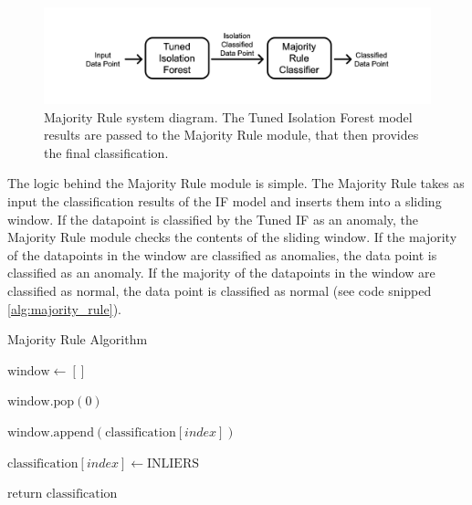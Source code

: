 \documentclass[futureinternet,article,submit,pdftex,moreauthors]{Definitions/mdpi}
\begin{document}
\begin{figure}[H]
	\includegraphics[width=12.5 cm]{img/ModulesStructure.jpg}
	\caption{Majority Rule system diagram. The Tuned Isolation Forest model results are passed to the Majority Rule module, that then provides the final classification.}
	\label{fig:MajorityRuleDiagram}
	\end{figure}   
\unskip

The logic behind the Majority Rule module is simple. The Majority Rule takes as input the classification results of the IF model and inserts them into a sliding window. If the datapoint is classified by the Tuned IF as an anomaly, the Majority Rule module checks the contents of the sliding window. If the 
majority of the datapoints in the window are classified as anomalies, the data point is classified as an anomaly. If the majority of the datapoints in the window are classified as normal, the data point is classified as normal (see code snipped \ref{alg:majority_rule}).

\begin{algorithm}
	\caption{Majority Rule Algorithm}\label{alg:majority_rule}
	\begin{algorithmic}[1]
		\State \hspace{1em} $\text{window} \leftarrow []$
		
				\State \hspace{1em} $\text{window.pop}(0)$
			\EndIf
			
			\State \hspace{1em} $\text{window.append}(\text{classification}[index])$
			
				\State \hspace{1em} $\text{classification}[index] \leftarrow \text{INLIERS}$
			\EndIf
		\EndFor
		
		\State \hspace{1em} $\text{return classification}$
	\end{algorithmic}
\end{algorithm}
\end{document}
